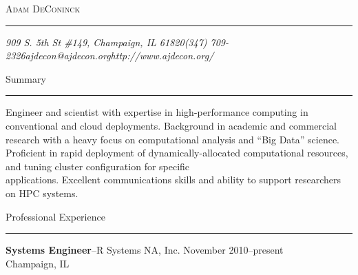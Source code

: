 \documentclass[10pt]{article}
\makeatletter
\newcommand{\name}{Adam DeConinck}
\newcommand{\addr}{909 S. 5th St \#149, Champaign, IL 61820}
\newcommand{\phone}{(347) 709-2326}
\newcommand{\email}{ajdecon@ajdecon.org}
\newcommand{\website}{http://www.ajdecon.org/}
\newcommand{\linkedin}{http://www.linkedin.com/in/ajdecon}
\newcommand{\bigname}[1]{
	\begin{center}\fontfamily{phv}\selectfont\Huge\scshape#1\end{center}
}
\newcommand{\bigsection}[1]{	
	\vspace{4pt}
	{\fontfamily{phv}\selectfont\Large#1}

	\vspace{-10pt} \rule{\textwidth}{1pt}
}
\newcommand{\jobitem}[4]{
    \vspace{2pt}

    \textbf{#1}--#2 \hfill #3\\ #4

    \vspace{-8pt}
}
\makeatother
\begin{document}
 \selectfont

\bigname{\name}

\vspace{-8pt} \rule{\textwidth}{1pt}

\vspace{-1pt} {\small\itshape \addr \hfill \phone \hfill \email \hfill \website} %

\vspace{6pt}
\bigsection{Summary}
Engineer and scientist with expertise in high-performance computing in conventional and cloud deployments. 
Background in academic and commercial research with a heavy focus on computational analysis and ``Big Data'' science. Proficient
in rapid deployment of dynamically-allocated computational resources, and tuning cluster configuration for specific \\ applications.  Excellent communications skills and ability to support 
researchers on HPC systems.

\vspace{4pt}
\bigsection{Professional Experience}

\vspace{-10pt}

\jobitem{Systems Engineer}{R Systems NA, Inc.}{November 2010--present}{Champaign, IL}
\end{document}
